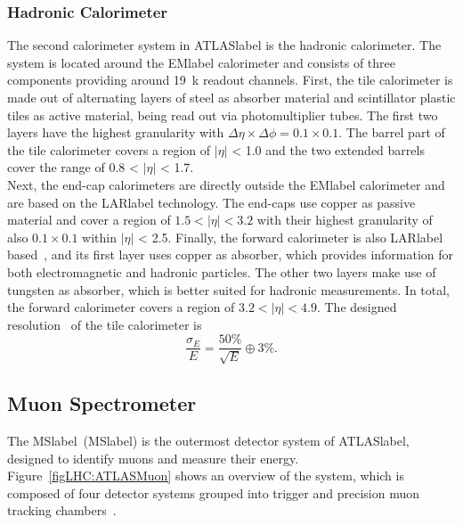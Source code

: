 \subsubsection*{Hadronic Calorimeter}

The second calorimeter system in \acrshort{ATLASlabel} is the hadronic calorimeter. The system is located around the \acrshort{EMlabel} calorimeter and consists of three components providing around 19~k readout channels. First, the tile calorimeter is made out of alternating layers of steel as absorber material and scintillator plastic tiles as active material, being read out via photomultiplier tubes. The first two layers have the highest granularity with $\Delta\eta\times\Delta\phi= 0.1\times 0.1$. The barrel part of the tile calorimeter covers a region of $|\eta|$ < 1.0 and the two extended barrels cover the range of 0.8 < $|\eta|$ < 1.7.\\

Next, the end-cap calorimeters are directly outside the \acrshort{EMlabel} calorimeter and are based on the \acrshort{LARlabel} technology. The end-caps use copper as passive material and cover a region of $1.5 < |\eta| < 3.2$ with their highest granularity of also $0.1\times 0.1$ within $|\eta|$ < 2.5. Finally, the forward calorimeter is also \acrshort{LARlabel} based~\cite{Artamonov_2008}, and its first layer uses copper as absorber, which provides information for both electromagnetic and hadronic particles. The other two layers make use of tungsten as absorber, which is better suited for hadronic measurements. In total, the forward calorimeter covers a region of $3.2 < |\eta| < 4.9$.
The designed resolution~\cite{Collaboration_2008} of the tile calorimeter is
\begin{equation}
    \frac{\sigma_E}{E} = \frac{50\%}{\sqrt{E}}\oplus 3\%.
\end{equation}


\subsection{Muon Spectrometer}

The \acrlong{MSlabel}~(\acrshort{MSlabel}) is the outermost detector system of \acrshort{ATLASlabel}, designed to identify muons and measure their energy. Figure~\ref{figLHC:ATLASMuon} shows an overview of the system, which is composed of four detector systems grouped into trigger and precision muon tracking chambers~\cite{CERN-LHCC-97-022,muoncommission}.\\

